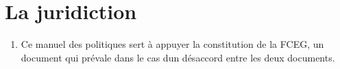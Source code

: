 \section{La juridiction}
\label{la-juridiction}

\begin{enumerate}
 \item
  Ce manuel des politiques sert à appuyer la constitution de la FCEG, un document qui prévale dans le cas d\textquotesingle un désaccord entre les deux documents.
\end{enumerate}

